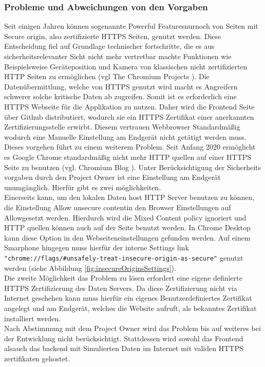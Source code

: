 \subsubsection{Probleme und Abweichungen von den Vorgaben}
Seit einigen Jahren können sogenannte \grqq Powerful Features\grqq\space nurnoch von Seiten mit \grqq Secure origin\grqq , also zertifizierte HTTPS Seiten, genutzt werden. Diese Entscheidung fiel auf Grundlage technischer fortschritte, die es aus sicherheitsrelevanter Sicht nicht mehr vertretbar machte Funktionen wie Beispielsweise Geräteposition und Kamera von klassischen nicht zertifizierten HTTP Seiten zu ermöglichen (vgl The Chromium Projects \cite{CameraHTTPSOnly}). Die Datenübermittlung, welche von HTTPS genutzt wird macht es Angreifern schwerer solche kritische Daten ab zugreifen. Somit ist es erforderlich eine HTTPS Webseite für die Applikation zu nutzen. Daher wird die Frontend Seite über Github distributiert, wodurch sie ein HTTPS Zertifikat einer anerkannten Zertifizierungsstelle erwirbt. Diesem vertrauen Webbrowser Standardmäßig wodurch eine Manuelle Einstellung am Endgerät nicht getätigt werden muss.\\
Dieses vorgehen führt zu einem weiterem Problem. Seit Anfang 2020 ermöglicht es Google Chrome standardmäßig nicht mehr HTTP quellen auf einer HTTPS Seite zu benutzen (vgl. Chromium Blog \cite{MixedSourcesPolicy}). Unter Berücksichtigung der Sicherheits vorgaben durch den Project Owner ist eine Einstellung am Endgerät unumgänglich. Hierfür gibt es zwei möglichkeiten.\\
Einerseits kann, um den lokalen Daten host HTTP Server benutzen zu können, die Einstellung \grqq Allow unsecure content\grqq\space in den Browser Einstellungen auf \grqq Allow\grqq\space gesetzt werden. Hierdurch wird die Mixed Content policy ignoriert und HTTP quellen können auch auf der Seite benutzt werden. In Chrome Desktop kann diese Option in den Webseiteneinstellungen gefunden werden. Auf einem Smarphone hingegen muss hierfür der interne Settings link \verb|"chrome://flags/#unsafely-treat-insecure-origin-as-secure"| genutzt werden (siehe Abbildung \ref{fig:insecureOriginsSettings}).\\
Die zweite Möglichkeit das Problem zu lösen erfordert eine eigene definierte HTTPS Zertifizierung des Daten Servers. Da diese Zertifizierung nicht via Internet geschehen kann muss hierfür ein eigenes Benutzerdefiniertes Zertifikat angelegt und am Endgerät, welches die Website aufruft, als bekanntes Zertifikat installiert werden.\\ 
Nach Abstimmung mit dem Project Owner wird das Problem bis auf weiteres bei der Entwicklung nicht berücksichtigt. Stattdessen wird sowohl das Frontend alsauch das backend mit Simulierten Daten im Internet mit validen HTTPS zertifikaten gehostet.

